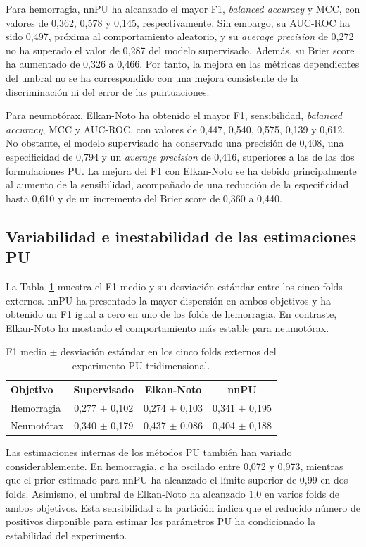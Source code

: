 Para hemorragia, nnPU ha alcanzado el mayor F1, \textit{balanced accuracy} y MCC, con valores de 0,362, 0,578 y 0,145, respectivamente. Sin embargo, su AUC-ROC ha sido 0,497, próxima al comportamiento aleatorio, y su \textit{average precision} de 0,272 no ha superado el valor de 0,287 del modelo supervisado. Además, su Brier score ha aumentado de 0,326 a 0,466. Por tanto, la mejora en las métricas dependientes del umbral no se ha correspondido con una mejora consistente de la discriminación ni del error de las puntuaciones.

Para neumotórax, Elkan-Noto ha obtenido el mayor F1, sensibilidad, \textit{balanced accuracy}, MCC y AUC-ROC, con valores de 0,447, 0,540, 0,575, 0,139 y 0,612. No obstante, el modelo supervisado ha conservado una precisión de 0,408, una especificidad de 0,794 y un \textit{average precision} de 0,416, superiores a las de las dos formulaciones PU. La mejora del F1 con Elkan-Noto se ha debido principalmente al aumento de la sensibilidad, acompañado de una reducción de la especificidad hasta 0,610 y de un incremento del Brier score de 0,360 a 0,440.

\subsection{Variabilidad e inestabilidad de las estimaciones PU}

La Tabla~\ref{tab:pu3d_f1_folds} muestra el F1 medio y su desviación estándar entre los cinco folds externos. nnPU ha presentado la mayor dispersión en ambos objetivos y ha obtenido un F1 igual a cero en uno de los folds de hemorragia. En contraste, Elkan-Noto ha mostrado el comportamiento más estable para neumotórax.

\begin{table}[!htbp]
\centering
\caption{F1 medio $\pm$ desviación estándar en los cinco folds externos del experimento PU tridimensional.}
\label{tab:pu3d_f1_folds}
\small
\begin{tabular}{lccc}
\toprule
\textbf{Objetivo} & \textbf{Supervisado} & \textbf{Elkan-Noto} & \textbf{nnPU} \\
\midrule
Hemorragia & 0,277 $\pm$ 0,102 & 0,274 $\pm$ 0,103 & 0,341 $\pm$ 0,195 \\
Neumotórax & 0,340 $\pm$ 0,179 & 0,437 $\pm$ 0,086 & 0,404 $\pm$ 0,188 \\
\bottomrule
\end{tabular}
\end{table}

Las estimaciones internas de los métodos PU también han variado considerablemente. En hemorragia, \(c\) ha oscilado entre 0,072 y 0,973, mientras que el prior estimado para nnPU ha alcanzado el límite superior de 0,99 en dos folds. Asimismo, el umbral de Elkan-Noto ha alcanzado 1,0 en varios folds de ambos objetivos. Esta sensibilidad a la partición indica que el reducido número de positivos disponible para estimar los parámetros PU ha condicionado la estabilidad del experimento.


